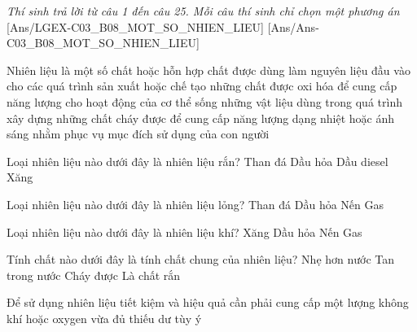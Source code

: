 \documentclass[Main.tex]{subfiles}
\begin{document}
\textit{\large Thí sinh trả lời từ câu 1 đến câu 25. Mỗi câu thí sinh chỉ chọn một phương án}
[Ans/LGEX-C03_B08_MOT_SO_NHIEN_LIEU]
[Ans/Ans-C03_B08_MOT_SO_NHIEN_LIEU]

\begin{ex}%
	Nhiên liệu là
	\choice
	{một số chất hoặc hỗn hợp chất được dùng làm nguyên liệu đầu vào cho các quá trình sản xuất hoặc chế tạo}
	{những chất được oxi hóa để cung cấp năng lượng cho hoạt động của cơ thể sống}
	{những vật liệu dùng trong quá trình xây dựng}
	{\True những chất cháy được để cung cấp năng lượng dạng nhiệt hoặc ánh sáng nhằm phục vụ mục đích sử dụng của con người}
\end{ex}

\begin{ex}%
	Loại nhiên liệu nào dưới đây là nhiên liệu rắn?
	\choice
	{\True Than đá}
	{Dầu hỏa}
	{Dầu diesel}
	{Xăng}
\end{ex}

\begin{ex}%
	Loại nhiên liệu nào dưới đây là nhiên liệu lỏng?
	\choice
	{Than đá}
	{\True Dầu hỏa}
	{Nến}
	{Gas}
\end{ex}

\begin{ex}%
	Loại nhiên liệu nào dưới đây là nhiên liệu khí?
	\choice
	{Xăng}
	{Dầu hỏa}
	{Nến}
	{\True Gas}
\end{ex}

\begin{ex}%
	Tính chất nào dưới đây là tính chất chung của nhiên liệu?
	\choice
	{Nhẹ hơn nước}
	{Tan trong nước}
	{\True Cháy được}
	{Là chất rắn}
\end{ex}

\begin{ex}%
	Để sử dụng nhiên liệu tiết kiệm và hiệu quả cần phải cung cấp một lượng không khí hoặc oxygen
	\choice
	{\True vừa đủ}
	{thiếu}
	{dư}
	{tùy ý}
\end{ex}
\end{document}
